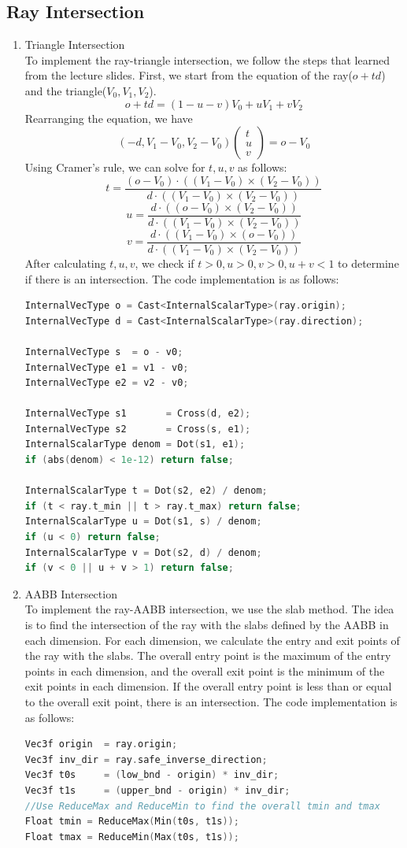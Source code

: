 \documentclass[acmtog]{acmart}
\begin{document}
\subsection{Ray Intersection}
\begin{enumerate}
	\item Triangle Intersection\\
	      To implement the ray-triangle intersection, we follow the steps that learned from the lecture slides.
	      First, we start from the equation of the ray($o+td$) and the triangle($V_0,V_1,V_2$). $$ o+td = (1-u-v)V_0+uV_1+vV_2$$
	      Rearranging the equation, we have $$(-d,V_1-V_0,V_2-V_0)\begin{pmatrix} t \\ u \\ v \end{pmatrix} = o-V_0 $$
	      Using Cramer's rule, we can solve for $t,u,v$ as follows:
	      $$t = \frac{(o-V_0)\cdot((V_1-V_0)\times(V_2-V_0))}{d\cdot((V_1-V_0)\times(V_2-V_0))}$$
	      $$u = \frac{d\cdot((o-V_0)\times(V_2-V_0))}{d\cdot((V_1-V_0)\times(V_2-V_0))}$$
	      $$v = \frac{d\cdot((V_1-V_0)\times(o-V_0))}{d\cdot((V_1-V_0)\times(V_2-V_0))}$$
	      After calculating $t,u,v$, we check if $t>0,u>0,v>0,u+v<1$ to determine if there is an intersection.
	      The code implementation is as follows:
	      \begin{lstlisting}[language=C++]
InternalVecType o = Cast<InternalScalarType>(ray.origin);
InternalVecType d = Cast<InternalScalarType>(ray.direction);

InternalVecType s  = o - v0;
InternalVecType e1 = v1 - v0;
InternalVecType e2 = v2 - v0;

InternalVecType s1       = Cross(d, e2);
InternalVecType s2       = Cross(s, e1);
InternalScalarType denom = Dot(s1, e1);
if (abs(denom) < 1e-12) return false;

InternalScalarType t = Dot(s2, e2) / denom;
if (t < ray.t_min || t > ray.t_max) return false;
InternalScalarType u = Dot(s1, s) / denom;
if (u < 0) return false;
InternalScalarType v = Dot(s2, d) / denom;
if (v < 0 || u + v > 1) return false;
		  \end{lstlisting}
	\item AABB Intersection\\
	      To implement the ray-AABB intersection, we use the slab method. The idea is to find the intersection of the ray with the slabs defined by the AABB in each dimension.
	      For each dimension, we calculate the entry and exit points of the ray with the slabs. The overall entry point is the maximum of the entry points in each dimension, and the overall exit point is the minimum of the exit points in each dimension.
	      If the overall entry point is less than or equal to the overall exit point, there is an intersection.
	      The code implementation is as follows:
	      \begin{lstlisting}[language=C++]
Vec3f origin  = ray.origin;
Vec3f inv_dir = ray.safe_inverse_direction;
Vec3f t0s     = (low_bnd - origin) * inv_dir;
Vec3f t1s     = (upper_bnd - origin) * inv_dir;
//Use ReduceMax and ReduceMin to find the overall tmin and tmax
Float tmin = ReduceMax(Min(t0s, t1s));
Float tmax = ReduceMin(Max(t0s, t1s));


\end{lstlisting}
\end{enumerate}
\end{document}

